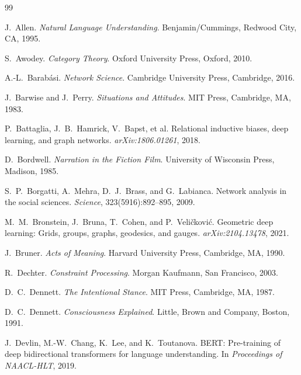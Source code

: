 \documentclass[12pt, a4paper]{article}
\begin{document}
\newpage
\begin{thebibliography}{99}

J.~Allen.
\newblock \textit{Natural Language Understanding}.
\newblock Benjamin/Cummings, Redwood City, CA, 1995.

S.~Awodey.
\newblock \textit{Category Theory}.
\newblock Oxford University Press, Oxford, 2010.

A.-L.~Barab\'asi.
\newblock \textit{Network Science}.
\newblock Cambridge University Press, Cambridge, 2016.

J.~Barwise and J.~Perry.
\newblock \textit{Situations and Attitudes}.
\newblock MIT Press, Cambridge, MA, 1983.

P.~Battaglia, J.~B.~Hamrick, V.~Bapst, et al.
\newblock Relational inductive biases, deep learning, and graph networks.
\newblock \textit{arXiv:1806.01261}, 2018.

D.~Bordwell.
\newblock \textit{Narration in the Fiction Film}.
\newblock University of Wisconsin Press, Madison, 1985.

S.~P.~Borgatti, A.~Mehra, D.~J.~Brass, and G.~Labianca.
\newblock Network analysis in the social sciences.
\newblock \textit{Science}, 323(5916):892--895, 2009.

M.~M.~Bronstein, J.~Bruna, T.~Cohen, and P.~Veličković.
\newblock Geometric deep learning: Grids, groups, graphs, geodesics, and gauges.
\newblock \textit{arXiv:2104.13478}, 2021.

J.~Bruner.
\newblock \textit{Acts of Meaning}.
\newblock Harvard University Press, Cambridge, MA, 1990.

R.~Dechter.
\newblock \textit{Constraint Processing}.
\newblock Morgan Kaufmann, San Francisco, 2003.

D.~C.~Dennett.
\newblock \textit{The Intentional Stance}.
\newblock MIT Press, Cambridge, MA, 1987.

D.~C.~Dennett.
\newblock \textit{Consciousness Explained}.
\newblock Little, Brown and Company, Boston, 1991.

J.~Devlin, M.-W.~Chang, K.~Lee, and K.~Toutanova.
\newblock BERT: Pre-training of deep bidirectional transformers for language understanding.
\newblock In \textit{Proceedings of NAACL-HLT}, 2019.


\end{thebibliography}
\end{document}
